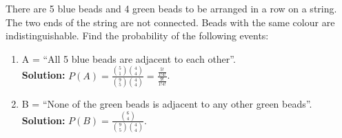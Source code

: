 \begin{example}
    There are 5 blue beads and 4 green beads to be arranged in a row on a string. The two ends of
    the string are not connected. Beads with the same colour are indistinguishable. Find the probability of
    the following events:
    \begin{enumerate}[label=(\alph*)]
        \item A = “All 5 blue beads are adjacent to each other”. \vspace{1mm} \\
        \textbf{Solution: } $P(A) = \frac{\binom{5}{1} \binom{4}{4}}{\binom{9}{5} \binom{4}{4}} = \frac{\frac{5!}{1!4!}}{\frac{9!}{1!4!}}$.
        \item B = “None of the green beads is adjacent to any other green beads”. \vspace{1mm} \\
        \textbf{Solution: } $P(B) = \frac{\binom{6}{4}}{\binom{9}{5} \binom{4}{4}}$.
    \end{enumerate}
    
\end{example}

\newpage